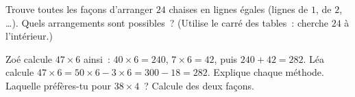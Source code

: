 \begin{exercise}[$\star\star$]\label{exo:g3:mult:11}
Trouve toutes les façons d'arranger $24$ chaises en lignes
égales (lignes de $1$, de $2$, \dots). Quels arrangements sont
possibles~? (Utilise le carré des tables~: cherche $24$ à
l'intérieur.)
\end{exercise}

\begin{exercise}[$\star\star$]\label{exo:g3:mult:12}
Zoé calcule $47 \times 6$ ainsi~: $40 \times 6 = 240$,
$7 \times 6 = 42$, puis $240 + 42 = 282$. Léa calcule
$47 \times 6 = 50 \times 6 - 3 \times 6 = 300 - 18 = 282$. Explique
chaque méthode. Laquelle préfères-tu pour $38 \times 4$~?
Calcule des deux façons.
\end{exercise}
